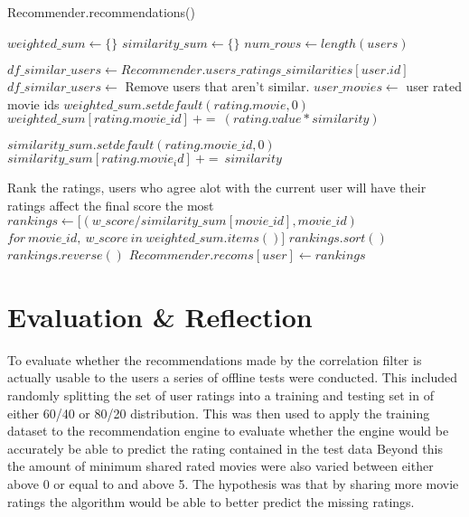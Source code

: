 	\begin{algorithm}[H]
		\caption{Recommender.recommendations()}
		\label{algorithm:recommendations}
		\begin{algorithmic}
			\STATE $weighted\_sum \leftarrow \{\}$
			\STATE $similarity\_sum \leftarrow \{\}$
			\STATE $num\_rows \leftarrow length(users)$
			
				\STATE $df\_similar\_users \leftarrow Recommender.users\_ratings\_similarities[user.id]$
				\STATE $df\_similar\_users \leftarrow $ Remove users that aren't similar.
				\STATE $user\_movies \leftarrow $ user rated movie ids
								\STATE $weighted\_sum.setdefault(rating.movie, 0) $
								\STATE $weighted\_sum[rating.movie\_id]\  + =\ (rating.value * similarity)$
								
								\STATE $similarity\_sum.setdefault(rating.movie\_id, 0)$
								\STATE $similarity\_sum[rating.movie_id]\ + =\ similarity$
							\ENDIF
						\ENDFOR
					\ENDIF
				\ENDFOR
			
				\STATE Rank the ratings, users who agree alot with the current user will have their ratings affect the final score the most
				\STATE $rankings \leftarrow [(w\_score / similarity\_sum[movie\_id], movie\_id)$
				\bindent
				    \STATE $for\ movie\_id,\ w\_score\ in\ weighted\_sum.items()]$  
				\eindent
				\STATE $rankings.sort()$
				\STATE $rankings.reverse()$
				\STATE $Recommender.recoms[user] \leftarrow rankings$
			\ENDFOR
		\end{algorithmic}
	\end{algorithm}


\section{Evaluation \& Reflection}

To evaluate whether the recommendations made by the correlation filter is actually usable to the users a series of offline tests were conducted. This included randomly splitting the set of user ratings into a training and testing set in of either 60/40 or 80/20 distribution. This was then used to apply the training dataset to the recommendation engine to evaluate whether the engine would be accurately be able to predict the rating contained in the test data Beyond this the amount of minimum shared rated movies were also varied between either above 0 or equal to and above 5. The hypothesis was that by sharing more movie ratings the algorithm would be able to better predict the missing ratings.

